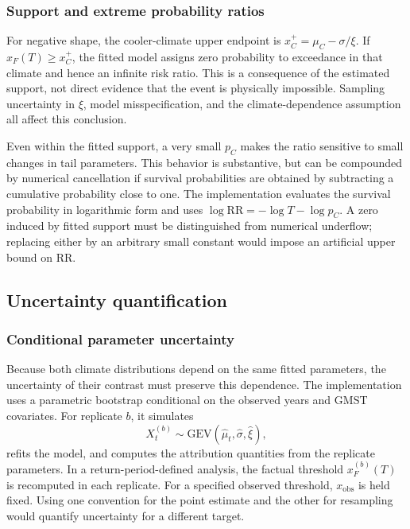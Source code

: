 \documentclass[11pt]{article}
\begin{document}
\subsubsection{Support and extreme probability ratios}
For negative shape, the cooler-climate upper endpoint is
$x_C^+=\mu_C-\sigma/\xi$. If $x_F(T)\geq x_C^+$, the fitted model assigns
zero probability to exceedance in that climate and hence an infinite
risk ratio. This is a consequence of the estimated support, not direct
evidence that the event is physically impossible. Sampling uncertainty
in $\xi$, model misspecification, and the climate-dependence assumption
all affect this conclusion.

Even within the fitted support, a very small $p_C$ makes the ratio
sensitive to small changes in tail parameters. This behavior is
substantive, but can be compounded by numerical cancellation if survival
probabilities are obtained by subtracting a cumulative probability close
to one. The implementation evaluates the survival probability in
logarithmic form and uses
$\log\mathrm{RR}=-\log T-\log p_C$. A zero induced by fitted support
must be distinguished from numerical underflow; replacing either by an
arbitrary small constant would impose an artificial upper bound on RR.


\subsection{Uncertainty quantification}
\label{sec:uncertainty}
\subsubsection{Conditional parameter uncertainty}
Because both climate distributions depend on the same fitted parameters,
the uncertainty of their contrast must preserve this dependence. The
implementation uses a parametric bootstrap conditional on the observed
years and GMST covariates. For replicate $b$, it simulates
\begin{equation}
X_t^{(b)}\sim
\mathrm{GEV}(\widehat\mu_t,\widehat\sigma,\widehat\xi),
\end{equation}
refits the model, and computes the attribution quantities from the
replicate parameters. In a return-period-defined analysis, the factual
threshold $x_F^{(b)}(T)$ is recomputed in each replicate. For a specified
observed threshold, $x_{\mathrm{obs}}$ is held fixed. Using one convention
for the point estimate and the other for resampling would quantify
uncertainty for a different target.
\end{document}
